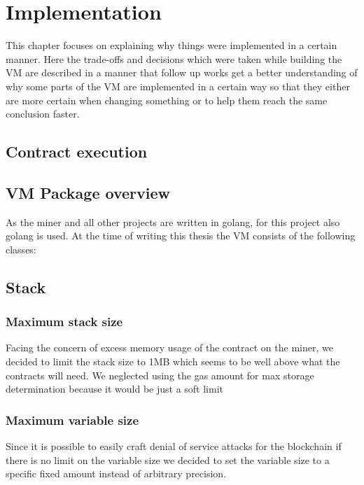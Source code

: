 \chapter{Implementation}
\thispagestyle{main} %
This chapter focuses on explaining why things were implemented in a certain manner. Here the trade-offs and decisions which were taken while building the VM are described in a manner that follow up works get a better understanding of why some parts of the VM are implemented in a certain way so that they either are more certain when changing something or to help them reach the same conclusion faster.

\section{Contract execution}

\section{VM Package overview}
As the miner and all other projects are written in golang, for this project also golang is used.
At the time of writing this thesis the VM consists of the following classes:





\section{Stack}


\subsection{Maximum stack size}
Facing the concern of excess memory usage of the contract on the miner, we decided to limit the stack size to 1MB which seems to be well above what the contracts will need. We neglected using the gas amount for max storage determination because it would be just a soft limit

\subsection{Maximum variable size}
Since it is possible to easily craft denial of service attacks for the blockchain if there is no limit on the variable size we decided to set the variable size to a specific fixed amount instead of arbitrary precision.

